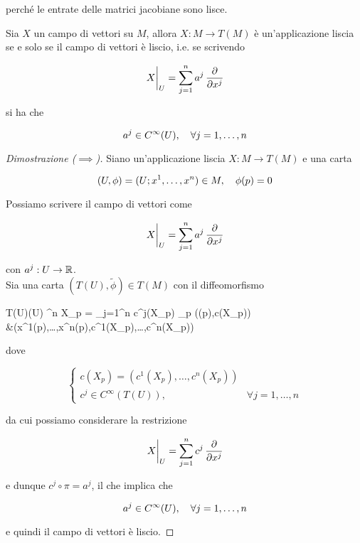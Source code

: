 perché le entrate delle matrici jacobiane sono lisce.

\begin{definition}
	Sia $ X $ un campo di vettori su $ M $, allora $ X : M \to T(M) $ è un'applicazione liscia se e solo se il campo di vettori è liscio, i.e. se scrivendo
	
	\begin{equation}
		\eval{X}_{U} = \sum_{j=1}^{n} a^{j} \, \pdv{x^{j}}
	\end{equation}

	si ha che
	
	\begin{equation}
		a^{j} \in C^{\infty}(U) \qcomma \forall j=1,\dots,n
	\end{equation}
\end{definition}

\begin{proof}[Dimostrazione ($ \implies $)]
	Siano un'applicazione liscia $ X : M \to T(M) $ e una carta
	
	\begin{equation}
		(U,\phi) = (U; x^{1},\dots,x^{n}) \in M \qcomma \phi(p) = 0
	\end{equation}
	
	Possiamo scrivere il campo di vettori come
	
	\begin{equation}
		\eval{X}_{U} = \sum_{j=1}^{n} a^{j} \, \pdv{x^{j}}
	\end{equation}

	con $ a^{j} : U \to \mathbb{R} $.\\
	Sia una carta $ (T(U),\tilde{\phi}) \in T(M) $ con il diffeomorfismo
	
	\map{\tilde{\phi}}
		{T(U)}{\phi(U) \times \R^{n}}
		{%
			X_{p} = \sum_{j=1}^{n} c^{j}(X_{p}) _{p}
			}
		{%
			(\phi(p),c(X_{p})) \\
			&\mapsto (x^{1}(p),\dots,x^{n}(p),c^{1}(X_{p}),\dots,c^{n}(X_{p}))
			}

	dove
	
	\begin{equation}
		\begin{cases}
			c(X_{p}) = (c^{1}(X_{p}),\dots,c^{n}(X_{p})) \\
			c^{j} \in C^{\infty}(T(U)), & \forall j=1,\dots,n
		\end{cases}
	\end{equation}

	da cui possiamo considerare la restrizione
	
	\begin{equation}
		\eval{X}_{U} = \sum_{j=1}^{n} c^{j} \, \pdv{x^{j}}
	\end{equation}

	e dunque $ c^{j} \circ \pi = a^{j} $, il che implica che
	
	\begin{equation}
		a^{j} \in C^{\infty}(U) \qcomma \forall j=1,\dots,n
	\end{equation}
	
	e quindi il campo di vettori è liscio.
\end{proof}

